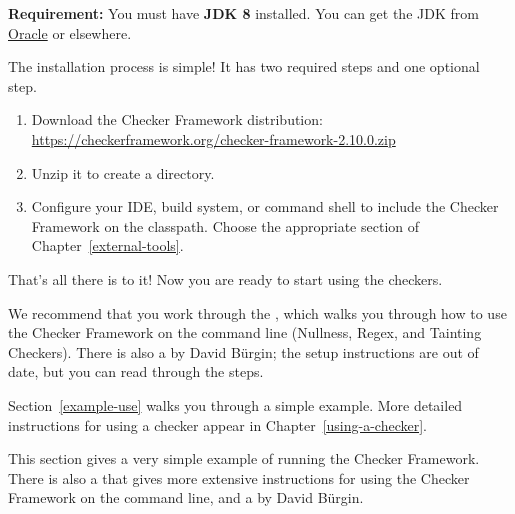 \textbf{Requirement:}
You must have \textbf{JDK 8}
installed.  You can get the JDK from
\href{https://www.oracle.com/technetwork/java/javase/downloads/index.html}{Oracle}
or elsewhere.

The installation process is simple!  It has two required steps and one
optional step.
\begin{enumerate}
\item
  Download the Checker Framework distribution:
  \\
  \url{https://checkerframework.org/checker-framework-2.10.0.zip}

\item
  Unzip it to create a  directory.

\item
  \label{installation-configure-step}%
  Configure your IDE, build system, or command shell to include the Checker
  Framework on the classpath.  Choose the appropriate section of
  Chapter~\ref{external-tools}.


\end{enumerate}

That's all there is to it!  Now you are ready to start using the checkers.

We recommend that you work through the
, which walks you through how to use the Checker
Framework on
the command line (Nullness, Regex, and Tainting Checkers).
There is also a
 by David B\"urgin; the setup instructions are out of date, but
you can read through the steps.

Section~\ref{example-use} walks you through a simple example.  More detailed
instructions for using a checker appear in Chapter~\ref{using-a-checker}.




This section gives a very simple example of running the Checker Framework.
There is also a 
that gives more extensive instructions for using the Checker Framework
on the command line,
and a
 by David B\"urgin.

